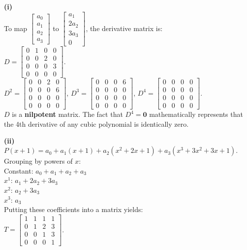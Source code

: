 \begin{solution}
\textbf{(i)} \\
To map $\begin{bmatrix} a_0 \\ a_1 \\ a_2 \\ a_3 \end{bmatrix}$ to $\begin{bmatrix} a_1 \\ 2a_2 \\ 3a_3 \\ 0 \end{bmatrix}$, the derivative matrix is: \\
$D = \begin{bmatrix} 0 & 1 & 0 & 0 \\ 0 & 0 & 2 & 0 \\ 0 & 0 & 0 & 3 \\ 0 & 0 & 0 & 0 \end{bmatrix}$. \\
$D^2 = \begin{bmatrix} 0 & 0 & 2 & 0 \\ 0 & 0 & 0 & 6 \\ 0 & 0 & 0 & 0 \\ 0 & 0 & 0 & 0 \end{bmatrix}$, $D^3 = \begin{bmatrix} 0 & 0 & 0 & 6 \\ 0 & 0 & 0 & 0 \\ 0 & 0 & 0 & 0 \\ 0 & 0 & 0 & 0 \end{bmatrix}$, $D^4 = \begin{bmatrix} 0 & 0 & 0 & 0 \\ 0 & 0 & 0 & 0 \\ 0 & 0 & 0 & 0 \\ 0 & 0 & 0 & 0 \end{bmatrix}$. \\
$D$ is a \textbf{nilpotent} matrix. The fact that $D^4 = \mathbf{0}$ mathematically represents that the 4th derivative of any cubic polynomial is identically zero.

\medskip
\textbf{(ii)} \\
$P(x+1) = a_0 + a_1(x+1) + a_2(x^2+2x+1) + a_3(x^3+3x^2+3x+1)$. \\
Grouping by powers of $x$: \\
Constant: $a_0 + a_1 + a_2 + a_3$ \\
$x^1$: $a_1 + 2a_2 + 3a_3$ \\
$x^2$: $a_2 + 3a_3$ \\
$x^3$: $a_3$ \\
Putting these coefficients into a matrix yields: \\
$T = \begin{bmatrix} 1 & 1 & 1 & 1 \\ 0 & 1 & 2 & 3 \\ 0 & 0 & 1 & 3 \\ 0 & 0 & 0 & 1 \end{bmatrix}$.


\end{solution}
